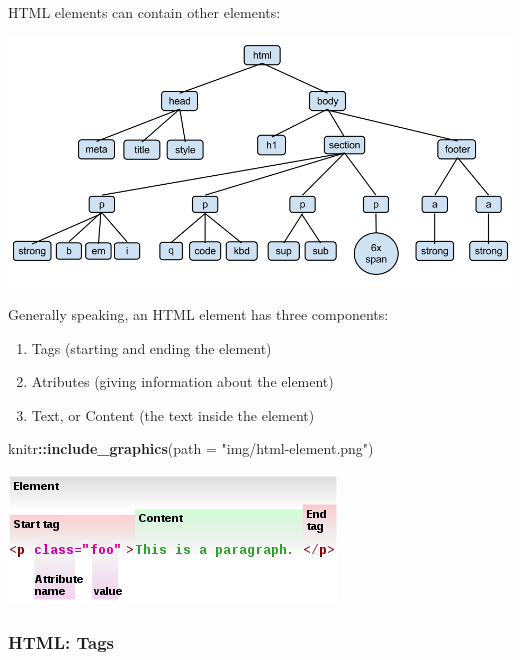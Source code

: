 \documentclass[]{book}
\newenvironment{Shaded}{\begin{snugshade}}{\end{snugshade}}
\newcommand{\DataTypeTok}[1]{\textcolor[rgb]{0.13,0.29,0.53}{#1}}
\newcommand{\KeywordTok}[1]{\textcolor[rgb]{0.13,0.29,0.53}{\textbf{#1}}}
\newcommand{\NormalTok}[1]{#1}
\newcommand{\OperatorTok}[1]{\textcolor[rgb]{0.81,0.36,0.00}{\textbf{#1}}}
\newcommand{\StringTok}[1]{\textcolor[rgb]{0.31,0.60,0.02}{#1}}
\providecommand{\tightlist}{%
  \setlength{\itemsep}{0pt}\setlength{\parskip}{0pt}}
\begin{document}
HTML elements can contain other elements:

\begin{center}\includegraphics[width=0.7\linewidth]{img/HTMLDOMTree} \end{center}

Generally speaking, an HTML element has three components:

\begin{enumerate}
\def\labelenumi{\arabic{enumi}.}
\tightlist
\item
  Tags (starting and ending the element)
\item
  Atributes (giving information about the element)
\item
  Text, or Content (the text inside the element)
\end{enumerate}

\begin{Shaded}
\begin{Highlighting}[]
\NormalTok{knitr}\OperatorTok{::}\KeywordTok{include_graphics}\NormalTok{(}\DataTypeTok{path =} \StringTok{"img/html-element.png"}\NormalTok{)}
\end{Highlighting}
\end{Shaded}

\begin{center}\includegraphics[width=0.7\linewidth]{img/html-element} \end{center}

\hypertarget{html-tags}{%
\subsubsection*{HTML: Tags}\label{html-tags}}
\end{document}
